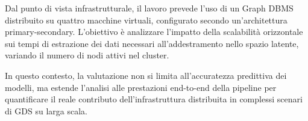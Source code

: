 Dal punto di vista infrastrutturale, il lavoro prevede l'uso di un Graph DBMS distribuito su quattro macchine virtuali, configurato secondo un'architettura primary-secondary. L'obiettivo è analizzare l'impatto della scalabilità orizzontale sui tempi di estrazione dei dati necessari all'addestramento nello spazio latente, variando il numero di nodi attivi nel cluster.

In questo contesto, la valutazione non si limita all'accuratezza predittiva dei modelli, ma estende l'analisi alle prestazioni end-to-end della pipeline per quantificare il reale contributo dell'infrastruttura distribuita in complessi scenari di GDS su larga scala.